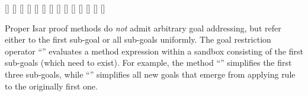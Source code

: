 \begin{isabellebody}
\begin{isamarkuptext}
  \begin{railoutput}
\rail@bar
{}[]
[]
[]
[]
\rail@endbar
\rail@bar
{}
[]
[]
[]
\rail@bar
{}
[]
\rail@endbar
{}[]
\rail@endbar
\rail@end
{}
\rail@plus
\rail@bar
{}[]
[]
[]
\rail@endbar
{}
\rail@bar
{}[]
[]
\rail@endbar
\rail@endplus
\rail@end
\end{railoutput}


  Proper Isar proof methods do \emph{not} admit arbitrary goal
  addressing, but refer either to the first sub-goal or all sub-goals
  uniformly.  The goal restriction operator ``''
  evaluates a method expression within a sandbox consisting of the
  first  sub-goals (which need to exist).  For example, the
  method ``'' simplifies the first three
  sub-goals, while ``'' simplifies all
  new goals that emerge from applying rule  to the
  originally first one.


\end{isamarkuptext}
\end{isabellebody}
